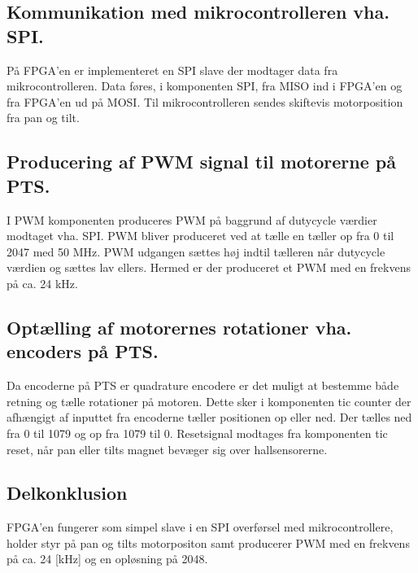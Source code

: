 \subsection{Kommunikation med mikrocontrolleren vha. SPI.}
På FPGA'en er implementeret en SPI slave der modtager data fra 
mikrocontrolleren. Data føres, i komponenten SPI, fra MISO ind i FPGA'en og fra FPGA'en ud på 
MOSI. Til mikrocontrolleren sendes skiftevis motorposition fra pan og tilt.

\subsection{Producering af PWM signal til motorerne på PTS.}
I PWM komponenten produceres PWM på baggrund af dutycycle værdier modtaget vha. SPI. 
PWM bliver produceret ved at tælle en tæller op fra 0 til 2047 med 50 MHz.
PWM udgangen sættes høj indtil tælleren når dutycycle værdien og sættes lav 
ellers. Hermed er der produceret et PWM med en frekvens på ca. 24 kHz.

\subsection{Optælling af motorernes rotationer vha. encoders på PTS.}
Da encoderne på PTS er quadrature encodere er det muligt at bestemme både retning og tælle rotationer på motoren. 
Dette sker i komponenten tic counter der afhængigt af inputtet fra encoderne tæller positionen op eller 
ned.
Der tælles ned fra 0 til 1079 og op  fra 1079 til 0.
Resetsignal modtages fra komponenten tic reset, når pan eller tilts magnet bevæger 
sig over hallsensorerne.

\subsection{Delkonklusion}
FPGA'en fungerer som simpel slave i en SPI overførsel med mikrocontrollere, holder styr på pan og tilts motorpositon samt producerer PWM 
med en frekvens på ca. 24 [kHz] og en opløsning på 2048.